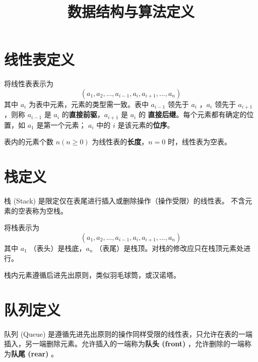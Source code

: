 \documentclass[12pt]{article}
\title{数据结构与算法定义}
\date{}
\begin{document}
\maketitle
\tableofcontents

\section{线性表定义}

将线性表表示为 $$(a_1, a_2, ..., a_{i-1}, a_i, a_{i+1}, ..., a_n)$$ 
其中 $a_i$ 为表中元素，元素的类型需一致。表中 $a_{i-1}$ 领先于 $a_i$ ，$a_i$ 领先于 
$a_{i+1}$ ，则称 $a_{i-1}$ 是 $a_i$ 的\textbf{直接前驱}，$a_{i+1}$ 是 $a_i$ 的
\textbf{直接后继}。每个元素都有确定的位置，如 $a_1$ 是第一个元素；
$a_i$ 中的 $i$ 是该元素的\textbf{位序}。

表内的元素个数 $n(n\geq0)$ 为线性表的\textbf{长度}，$n=0$ 时，线性表为空表。

\section{栈定义}

栈 (Stack) 是限定仅在表尾进行插入或删除操作（操作受限）的线性表。
不含元素的空表称为空栈。

将栈表示为 $$(a_1, a_2, ..., a_{i-1}, a_i, a_{i+1}, ..., a_n)$$ 
其中 $a_1$ （表头）是栈底，$a_n$ （表尾）是栈顶。对栈的修改应只在栈顶元素处进行。

栈内元素遵循后进先出原则，类似羽毛球筒，或汉诺塔。

\section{队列定义}

队列 (Queue) 是遵循先进先出原则的操作同样受限的线性表，只允许在表的一端插入，另一端删除元素。允许插入的一端称为\textbf{队头 (front)} ，允许删除的一端称为\textbf{队尾 (rear) }。
\end{document}
